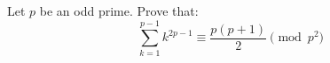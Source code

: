 Let $p$ be an odd prime. Prove that:\[\displaystyle\sum_{k=1}^{p-1}k^{2p-1} \equiv \frac{p(p+1)}{2} \pmod{p^2}\]